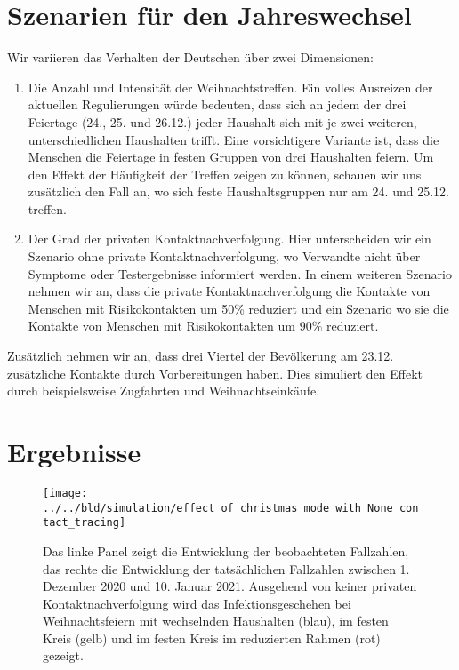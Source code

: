 \documentclass[a4paper,11pt,leqno,fleqn]{article}
\begin{document}
\section{Szenarien für den Jahreswechsel}

Wir variieren das Verhalten der Deutschen über zwei Dimensionen:

\begin{enumerate}
    \item Die Anzahl und Intensität der Weihnachtstreffen.
    Ein volles Ausreizen der aktuellen Regulierungen würde bedeuten, dass sich an jedem der drei Feiertage (24., 25. und 26.12.) jeder Haushalt sich mit je zwei weiteren, unterschiedlichen Haushalten trifft. Eine vorsichtigere Variante ist, dass die Menschen die Feiertage in festen Gruppen von drei Haushalten feiern. Um den Effekt der Häufigkeit der Treffen zeigen zu können, schauen wir uns zusätzlich den Fall an, wo sich feste Haushaltsgruppen nur am 24. und 25.12. treffen.
    \item Der Grad der privaten Kontaktnachverfolgung. Hier unterscheiden wir ein Szenario ohne private Kontaktnachverfolgung, wo Verwandte nicht über Symptome oder Testergebnisse informiert werden. In einem weiteren Szenario nehmen wir an, dass die private Kontaktnachverfolgung die Kontakte von Menschen mit Risikokontakten um 50\% reduziert und ein Szenario wo sie die Kontakte von Menschen mit Risikokontakten um 90\% reduziert.
\end{enumerate}

Zusätzlich nehmen wir an, dass drei Viertel der Bevölkerung am 23.12. zusätzliche Kontakte durch Vorbereitungen haben. Dies simuliert den Effekt durch beispielsweise Zugfahrten und Weihnachtseinkäufe.

\FloatBarrier
\section{Ergebnisse}


\begin{figure}
\label{fig:effect_of_christmas_without_contact_tracing}
\texttt{[image: ../../bld/simulation/effect\_of\_christmas\_mode\_with\_None\_contact\_tracing]}
\caption{
    Das linke Panel zeigt die Entwicklung der beobachteten Fallzahlen, das rechte die Entwicklung der tatsächlichen Fallzahlen zwischen 1. Dezember 2020 und 10. Januar 2021. Ausgehend von keiner privaten Kontaktnachverfolgung wird das Infektionsgeschehen bei Weihnachtsfeiern mit wechselnden Haushalten (blau), im festen Kreis (gelb) und im festen Kreis im reduzierten Rahmen (rot) gezeigt.
}
\end{figure}
\end{document}
